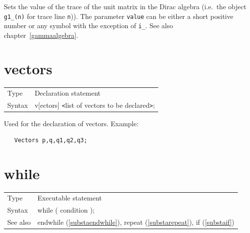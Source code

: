 \noindent Sets the value of the trace of the 
unit matrix in the Dirac 
algebra (i.e.\ the object \verb:g1_(n): for trace line 
\verb:n:)). The parameter \verb:value: can be either a short positive 
number or any symbol with the exception of \verb:i_:. See also 
chapter~\ref{gammaalgebra}. \vspace{10mm}


\section{vectors}
\label{substavectors}

\noindent \begin{tabular}{ll}
Type & Declaration statement\\
Syntax & v[ectors] {\tt<}list of vectors to be declared{\tt>};
\end{tabular} \vspace{4mm}

\noindent Used for the declaration of vectors. Example:
\begin{verbatim}
   Vectors p,q,q1,q2,q3;
\end{verbatim}
\vspace{10mm}


\section{while}
\label{substawhile}

\noindent \begin{tabular}{ll}
Type & Executable statement\\
Syntax & while ( condition );
\\ See also & endwhile (\ref{substaendwhile}), repeat (\ref{substarepeat}),
            if (\ref{substaif})
\end{tabular} \vspace{4mm}

